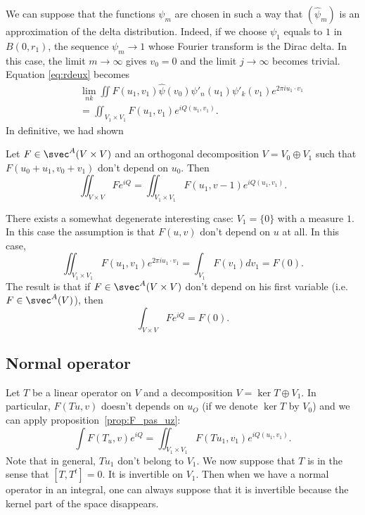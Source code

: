 We can suppose that the functions $\psi_m$ are chosen in such a way that $(\hat\psi_m)$ is an approximation of the delta distribution. Indeed, if we choose $\psi_1$ equals to $1$ in $B(0,r_1)$, the sequence $\psi_m\to 1$ whose Fourier transform is the Dirac delta. In this case, the limit $m\to\infty$ gives $v_0=0$ and the limit $j\to \infty$ becomes trivial. Equation \eqref{eq:rdeux} becomes
\begin{equation}
	\begin{split}
		\quad&\lim_{nk}\iint F(u_1,v_1)\hat\psi(v_0)\psi'_n(u_1)\psi'_k(v_1)e^{2\pi i u_1\cdot v_1}\\
		&=\iint_{V_1\times V_1}F(u_1,v_1)e^{iQ(u_1,v_1)}.
	\end{split}
\end{equation}
In definitive, we had shown

\begin{proposition} \label{prop:F_pas_uz}
	Let $F\in\svec^A(V\times V)$ and an orthogonal decomposition $V=V_0\oplus V_1$ such that $F(u_0+u_1,v_0+v_1)$ don't depend on $u_0$. Then
	\[
		\iint_{V\times V}Fe^{iQ}=\iint_{V_1\times V_1}F(u_1,v-1)e^{iQ(u_1,v_1)}.
	\]

\end{proposition}


There exists a somewhat degenerate interesting case: $V_1=\{ 0 \}$ with a measure $1$. In this case the assumption is that $F(u,v)$ don't depend on $u$ at all. In this case,
\[
	\iint_{V_1\times V_1}F(u_1,v_1)e^{2\pi i u_1\cdot v_1}=\int_{V_1}F(v_1)dv_1=F(0).
\]
The result is that if $F\in\svec^A(V\times V)$ don't depend on his first variable (i.e. $F\in\svec^A(V)$), then
\[
	\int_{V\times V}Fe^{iQ}=F(0).
\]


\subsection{Normal operator}

Let $T$ be a linear operator on $V$ and a decomposition $V=\ker T\oplus V_1$. In particular, $F(Tu,v)$  doesn't depends on $u_O$ (if we denote $\ker T$ by $V_0$) and we can apply proposition~\ref{prop:F_pas_uz}:
\[
	\int F(T_u,v)e^{iQ}=\iint_{V_1\times V_1}F(Tu_1,v_1)e^{iQ(u_1,v_1)}.
\]
Note that in general, $Tu_1$ don't belong to $V_1$. We now suppose that $T$ is  in the sense that $[T,T^t]=0$. It is invertible on $V_1$. Then when we have a normal operator in an integral, one can always suppose that it is invertible because the kernel part of the space disappears.

